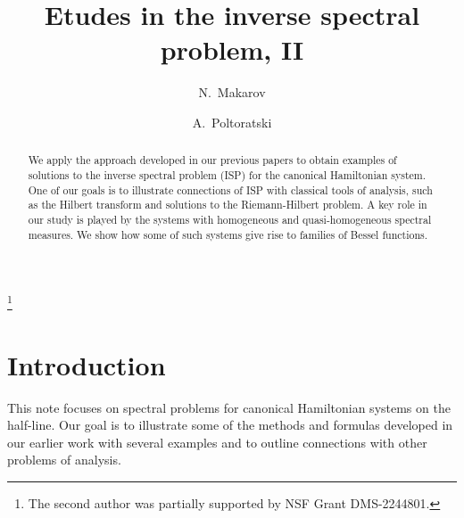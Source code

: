 \documentclass[11pt,twoside,reqno]{amsart}
\title{Etudes in  the inverse spectral problem, II}
\theoremstyle{plain}
\numberwithin{equation}{section}
\begin{document}
	
	
	
	\author{N.~Makarov}
	\address{California Institute of Technology\\
		Department of Mathematics\\
		Pasadena, CA 91125, USA}
	
	\author{A.~Poltoratski}
	\address{University of Wisconsin\\ Department of Mathematics\\ Van Vleck Hall\\
		480 Lincoln Drive\\
		Madison, WI  53706\\ USA }
	\thanks{The second author was partially supported by
		NSF Grant DMS-2244801.}
	
	\begin{abstract} We apply the approach developed in our previous papers \cite{MIF1, MP3, etudes} to obtain examples of solutions to the inverse spectral problem (ISP) for the canonical Hamiltonian system. One of our goals is to illustrate connections of ISP with classical tools of analysis, such as the Hilbert transform and solutions to the Riemann-Hilbert problem. A key role in our study is played by the systems with homogeneous and quasi-homogeneous spectral measures. We show how some of such systems give rise to families of Bessel functions.
	\end{abstract}



\maketitle

\section{Introduction}

This note focuses on spectral problems for canonical Hamiltonian systems on the half-line. Our goal is to illustrate some of the methods and formulas developed in our earlier work with several examples and to outline connections with other problems of analysis. 
\end{document}
